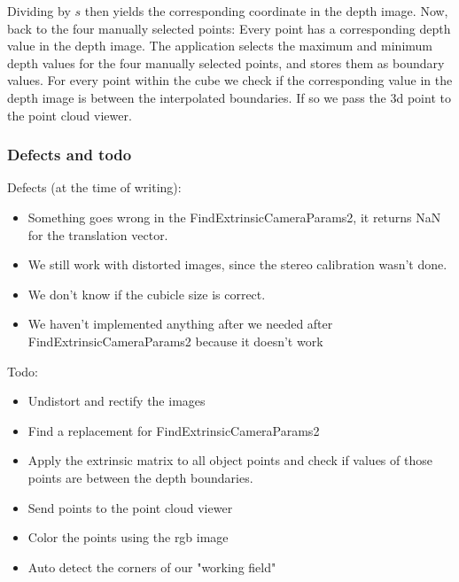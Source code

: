 Dividing by $s$ then yields the corresponding coordinate in the depth image.
Now, back to the four manually selected points: Every point has a corresponding
depth value in the depth image. The application selects the maximum and minimum
depth values for the four manually selected points, and stores them as boundary
values. For every point within the cube we check if the corresponding value in
the depth image is between the interpolated boundaries. If so we pass the 3d
point to the point cloud viewer. 

\subsubsection{Defects and todo}

Defects (at the time of writing):

\begin{itemize}

\item Something goes wrong in the FindExtrinsicCameraParams2, it returns NaN for the translation vector.

\item We still work with distorted images, since the stereo calibration wasn't done.

\item We don't know if the cubicle size is correct.

\item We haven't implemented anything after we needed after FindExtrinsicCameraParams2 because it doesn't work

\end{itemize}

Todo: 

\begin{itemize}

\item Undistort and rectify the images%

\item Find a replacement for FindExtrinsicCameraParams2%

\item Apply the extrinsic matrix to all object points and check if values of those points are between the depth boundaries.%

\item Send points to the point cloud viewer%

\item Color the points using the rgb image%

\item Auto detect the corners of our "working field"%

\end{itemize}

